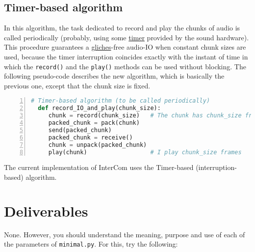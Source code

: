 \subsection{Timer-based algorithm}

In this algorithm, the task dedicated to record and play the chunks of
audio is called periodically (probably, using some
\href{https://en.wikipedia.org/wiki/Timer}{timer} provided by the
sound hardware). This procedure guarantees a
\href{https://en.wikipedia.org/wiki/Glitch}{gliches}-free audio-IO
when constant chunk sizes are used, because the timer interruption
coincides exactly with the instant of time in which the
\verb|record()| and the \verb|play()| methods can be used without
blocking. The following pseudo-code describes the new algorithm, which
is basically the previous one, except that the chunk size is fixed.

\begin{lstlisting}[language=Python,numbers=left]
  # Timer-based algorithm (to be called periodically)
  def record_IO_and_play(chunk_size):
     chunk = record(chunk_size)   # The chunk has chunk_size frames
     packed_chunk = pack(chunk)
     send(packed_chunk)
     packed_chunk = receive()
     chunk = unpack(packed_chunk)
     play(chunk)                  # I play chunk_size frames
\end{lstlisting}


The current implementation of InterCom uses the Timer-based
(interruption-based) algorithm.

\section{Deliverables}

None. However, you should understand the meaning, purpose and use of
each of the parameters of \texttt{minimal.py}. For this, try the
following:

